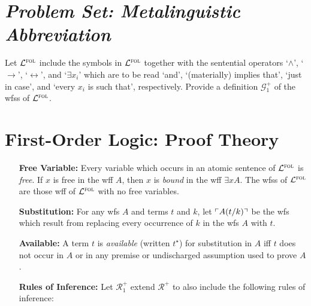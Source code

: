 \documentclass[a4paper, 11pt]{article} %
\begin{document}
\section*{\it Problem Set: Metalinguistic Abbreviation}

Let $\mathcal{L}^{\textsc{fol}}$ include the symbols in $\mathcal{L}^{\textsc{fol}}$ together with the sentential operators `$\wedge$', `$\rightarrow$', `$\leftrightarrow$', and `$\exists x_i$' which are to be read `and', `(materially) implies that', `just in case', and `every $x_i$ is such that', respectively. Provide a definition $\mathcal{G}_1^+$ of the wfss of $\mathcal{L}^{\textsc{fol}}$.




\section*{\sc First-Order Logic: Proof Theory}

\begin{enumerate}[leftmargin=1.2in,labelsep=.15in] %
\item[\bf Free Variable:] Every variable which occurs in an atomic sentence of $\mathcal{L}^{\textsc{fol}}$ is \textit{free}. If $x$ is free in the wff $A$, then $x$ is \textit{bound} in the wff $\exists xA$. The wfss of $\mathcal{L}^{\textsc{fol}}$ are those wff of $\mathcal{L}^{\textsc{fol}}$ with no free variables.
\item[\bf Substitution:] For any wfs ${A}$ and terms $t$ and $k$, let $\ulcorner A(t/k)\urcorner$ be the wfs which result from replacing every occurrence of $k$ in the wfs ${A}$ with $t$.
\item[\bf Available:] A term $t$ is \textit{available} (written $t^\star$) for substitution in ${A}$ iff $t$ does not occur in ${A}$ or in any premise or undischarged assumption used to prove $A$.
\item[\bf Rules of Inference:] Let $\mathcal{R}_1^+$ extend $\mathcal{R}^+$ to also include the following rules of inference:%
\end{enumerate}
\end{document}
